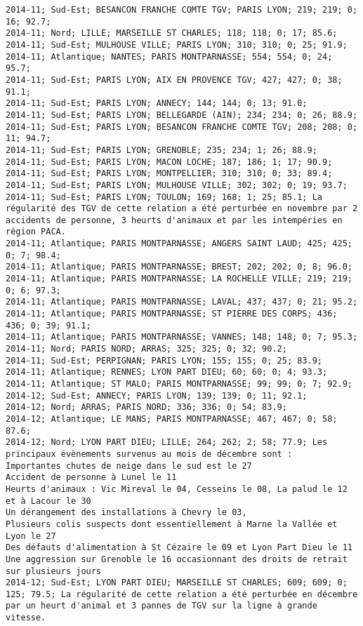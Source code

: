 \documentclass{article}
\begin{document}
\begin{Verbatim}[commandchars=\\\{\}]
2014-11; Sud-Est; BESANCON FRANCHE COMTE TGV; PARIS LYON; 219; 219; 0; 16; 92.7; 
2014-11; Nord; LILLE; MARSEILLE ST CHARLES; 118; 118; 0; 17; 85.6; 
2014-11; Sud-Est; MULHOUSE VILLE; PARIS LYON; 310; 310; 0; 25; 91.9; 
2014-11; Atlantique; NANTES; PARIS MONTPARNASSE; 554; 554; 0; 24; 95.7; 
2014-11; Sud-Est; PARIS LYON; AIX EN PROVENCE TGV; 427; 427; 0; 38; 91.1; 
2014-11; Sud-Est; PARIS LYON; ANNECY; 144; 144; 0; 13; 91.0; 
2014-11; Sud-Est; PARIS LYON; BELLEGARDE (AIN); 234; 234; 0; 26; 88.9; 
2014-11; Sud-Est; PARIS LYON; BESANCON FRANCHE COMTE TGV; 208; 208; 0; 11; 94.7; 
2014-11; Sud-Est; PARIS LYON; GRENOBLE; 235; 234; 1; 26; 88.9; 
2014-11; Sud-Est; PARIS LYON; MACON LOCHE; 187; 186; 1; 17; 90.9; 
2014-11; Sud-Est; PARIS LYON; MONTPELLIER; 310; 310; 0; 33; 89.4; 
2014-11; Sud-Est; PARIS LYON; MULHOUSE VILLE; 302; 302; 0; 19; 93.7; 
2014-11; Sud-Est; PARIS LYON; TOULON; 169; 168; 1; 25; 85.1; La régularité des TGV de cette relation a été perturbée en novembre par 2 accidents de personne, 3 heurts d'animaux et par les intempéries en région PACA.
2014-11; Atlantique; PARIS MONTPARNASSE; ANGERS SAINT LAUD; 425; 425; 0; 7; 98.4; 
2014-11; Atlantique; PARIS MONTPARNASSE; BREST; 202; 202; 0; 8; 96.0; 
2014-11; Atlantique; PARIS MONTPARNASSE; LA ROCHELLE VILLE; 219; 219; 0; 6; 97.3; 
2014-11; Atlantique; PARIS MONTPARNASSE; LAVAL; 437; 437; 0; 21; 95.2; 
2014-11; Atlantique; PARIS MONTPARNASSE; ST PIERRE DES CORPS; 436; 436; 0; 39; 91.1; 
2014-11; Atlantique; PARIS MONTPARNASSE; VANNES; 148; 148; 0; 7; 95.3; 
2014-11; Nord; PARIS NORD; ARRAS; 325; 325; 0; 32; 90.2; 
2014-11; Sud-Est; PERPIGNAN; PARIS LYON; 155; 155; 0; 25; 83.9; 
2014-11; Atlantique; RENNES; LYON PART DIEU; 60; 60; 0; 4; 93.3; 
2014-11; Atlantique; ST MALO; PARIS MONTPARNASSE; 99; 99; 0; 7; 92.9; 
2014-12; Sud-Est; ANNECY; PARIS LYON; 139; 139; 0; 11; 92.1; 
2014-12; Nord; ARRAS; PARIS NORD; 336; 336; 0; 54; 83.9; 
2014-12; Atlantique; LE MANS; PARIS MONTPARNASSE; 467; 467; 0; 58; 87.6; 
2014-12; Nord; LYON PART DIEU; LILLE; 264; 262; 2; 58; 77.9; Les principaux évènements survenus au mois de décembre sont :
Importantes chutes de neige dans le sud est le 27
Accident de personne à Lunel le 11
Heurts d'animaux : Vic Mireval le 04, Cesseins le 08, La palud le 12 et à Lacour le 30
Un dérangement des installations à Chevry le 03, 
Plusieurs colis suspects dont essentiellement à Marne la Vallée et Lyon le 27 
Des défauts d'alimentation à St Cézaire le 09 et Lyon Part Dieu le 11
Une aggression sur Grenoble le 16 occasionnant des droits de retrait sur plusieurs jours 
2014-12; Sud-Est; LYON PART DIEU; MARSEILLE ST CHARLES; 609; 609; 0; 125; 79.5; La régularité de cette relation a été perturbée en décembre par un heurt d'animal et 3 pannes de TGV sur la ligne à grande vitesse.

\end{Verbatim}
\end{document}
